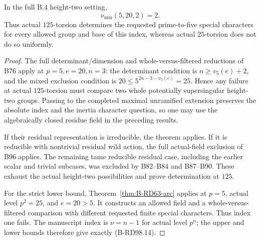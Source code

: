\begin{corollary}
\label{cor:B-RD98-exact-five}
In the full B.4 height-two setting,
\[
                         \nu_{\min}(5,20,2)=2.
                                                        \tag{B-RD98.14}
\]
Thus actual $125$-torsion determines the requested prime-to-five
special characters for every allowed group and base of this index,
whereas actual $25$-torsion does not do so uniformly.
\end{corollary}
\begin{proof}
The full determinant/dimension and whole-versus-filtered
reductions of B76 apply at $p=5,e=20,n=3$: the determinant
condition is $n\ge v_5(e)+2$, and the mixed exclusion condition
is $20\le5^{2n-3-v_5(e)}=25$. Hence any failure at actual
$125$-torsion must compare two whole potentially supersingular
height-two groups. Passing to the completed maximal unramified
extension preserves the absolute index and the inertia character
question, so one may use the algebraically closed residue field
in the preceding results.

If their residual representation is irreducible, the theorem
applies. If it is reducible with nontrivial residual wild action,
the full actual-field exclusion of B96 applies. The remaining
tame reducible residual case, including the earlier scalar and
trivial subcases, was excluded by B82--B84 and B87--B90.
These exhaust the actual height-two possibilities and prove
determination at $125$.

For the strict lower bound, Theorem~\ref{thm:B-RD63-arc}
applies at $p=5$, actual level $p^2=25$, and $e=20>5$.
It constructs an allowed field and a whole-versus-filtered
comparison with different requested finite special characters.
Thus index one fails. The manuscript index is $\nu=n-1$
for actual level $p^n$; the upper and lower bounds therefore
give exactly (B-RD98.14).
\end{proof}

